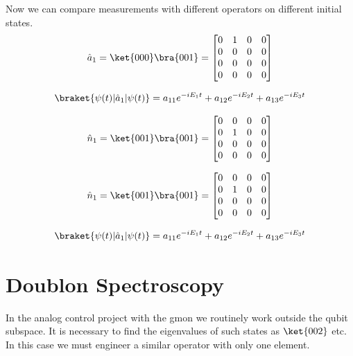 Now we can compare measurements with different operators on different initial states.
\begin{equation}
    \hat{a}_1 = \ket{000}\bra{001} =
    \begin{bmatrix}
        0 & 1 & 0 & 0 \\
        0 & 0 & 0 & 0 \\
        0 & 0 & 0 & 0 \\
        0 & 0 & 0 & 0 \\
    \end{bmatrix}
\end{equation}

\begin{equation}
    \braket{\psi(t)|\hat{a}_1|\psi(t)} = a_{11} e^{-i E_1 t} + a_{12} e^{-i E_2 t} + a_{13} e^{-i E_3 t}
\end{equation}

\begin{equation}
    \hat{n}_1 = \ket{001}\bra{001} =
    \begin{bmatrix}
        0 & 0 & 0 & 0 \\
        0 & 1 & 0 & 0 \\
        0 & 0 & 0 & 0 \\
        0 & 0 & 0 & 0 \\
    \end{bmatrix}
\end{equation}


\begin{equation}
    \hat{n}_1 = \ket{001}\bra{001} =
    \begin{bmatrix}
        0 & 0 & 0 & 0 \\
        0 & 1 & 0 & 0 \\
        0 & 0 & 0 & 0 \\
        0 & 0 & 0 & 0 \\
    \end{bmatrix}
\end{equation}

\begin{equation}
    \braket{\psi(t)|\hat{a}_1|\psi(t)} = a_{11} e^{-i E_1 t} + a_{12} e^{-i E_2 t} + a_{13} e^{-i E_3 t}
\end{equation}

\section{Doublon Spectroscopy}
In the analog control project with the gmon we routinely work outside the qubit subspace.  It is necessary to find the eigenvalues of such states as $\ket{002}$ etc.
In this case we must engineer a similar operator with only one element.

